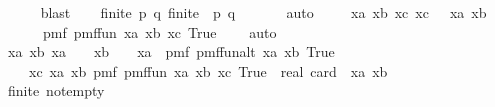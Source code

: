 \begin{isabellebody}
\ \ \ \ \isamarkupfalse%
\ blast\isanewline
\isanewline
\ \ \isamarkupfalse%
\ {\isasymZ}{\isacharunderscore}{\kern0pt}finite{\isacharcolon}{\kern0pt}\ {\isachardoublequoteopen}{\isasymAnd}p\ q{\isachardot}{\kern0pt}\ finite\ {\isacharparenleft}{\kern0pt}{\isacharquery}{\kern0pt}{\isasymZ}\ p\ q{\isacharparenright}{\kern0pt}{\isachardoublequoteclose}\ \isanewline
\ \ \ \ \isamarkupfalse%
\ auto\ \isanewline
\isanewline
\ \ \isamarkupfalse%
\ {\isachardoublequoteopen}{\isasymAnd}xa\ xb\ xc{\isachardot}{\kern0pt}\ xc\ {\isasymin}\ {\isacharparenleft}{\kern0pt}{\isacharquery}{\kern0pt}{\isasymZ}\ xa\ xb{\isacharparenright}{\kern0pt}\isanewline
\ \ \ \ \ {\isasymLongrightarrow}\ pmf\ {\isacharparenleft}{\kern0pt}{\isacharparenleft}{\kern0pt}{\isacharquery}{\kern0pt}pmf{\isacharunderscore}{\kern0pt}fun{\isacharunderscore}{\kern0pt}{}\ xa\ xb{\isacharparenright}{\kern0pt}\ xc{\isacharparenright}{\kern0pt}\ True\ {\isacharequal}{\kern0pt}\ {}{\isachardoublequoteclose}\ \isamarkupfalse%
\ auto\ \isanewline
\ \ \isanewline
\ \ \isamarkupfalse%
\ {\isachardoublequoteopen}{\isasymAnd}xa\ xb{\isachardot}{\kern0pt}\ xa\ {\isasymin}\ {\isacharquery}{\kern0pt}{\isasymK}\ {\isasymLongrightarrow}\ xb\ {\isasymin}\ {\isacharquery}{\kern0pt}{\isasymK}\ {\isacharminus}{\kern0pt}\ {\isacharbraceleft}{\kern0pt}xa{\isacharbraceright}{\kern0pt}\ {\isasymLongrightarrow}\ pmf\ {\isacharparenleft}{\kern0pt}{\isacharquery}{\kern0pt}pmf{\isacharunderscore}{\kern0pt}fun{\isacharunderscore}{\kern0pt}{}alt\ xa\ xb{\isacharparenright}{\kern0pt}\ True\ {\isacharequal}{\kern0pt}\ \isanewline
\ \ \ \ {\isacharparenleft}{\kern0pt}{\isasymSum}xc{\isasymin}{\isacharparenleft}{\kern0pt}{\isacharquery}{\kern0pt}{\isasymZ}\ xa\ xb{\isacharparenright}{\kern0pt}{\isachardot}{\kern0pt}\ pmf\ {\isacharparenleft}{\kern0pt}{\isacharparenleft}{\kern0pt}{\isacharquery}{\kern0pt}pmf{\isacharunderscore}{\kern0pt}fun{\isacharunderscore}{\kern0pt}{}\ xa\ xb{\isacharparenright}{\kern0pt}\ xc{\isacharparenright}{\kern0pt}\ True{\isacharparenright}{\kern0pt}\ {\isacharslash}{\kern0pt}\ real\ {\isacharparenleft}{\kern0pt}card\ {\isacharparenleft}{\kern0pt}{\isacharquery}{\kern0pt}{\isasymZ}\ xa\ xb{\isacharparenright}{\kern0pt}{\isacharparenright}{\kern0pt}{\isachardoublequoteclose}\ \isanewline
\ \ \ \ \isamarkupfalse%
\ {\isasymZ}{\isacharunderscore}{\kern0pt}finite\ {\isasymZ}{\isacharunderscore}{\kern0pt}not{\isacharunderscore}{\kern0pt}empty\isanewline

\end{isabellebody}
